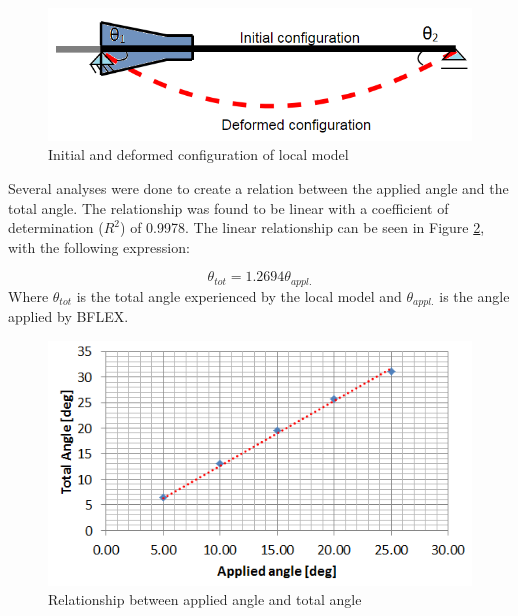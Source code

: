 \begin{figure}[H]
\centering
\includegraphics[scale=0.75]{figures/anglecorr}
\caption[Initial and deformed configuration of local model]{Initial and deformed configuration of local model}
 \label{fig:anglecorr}
\end{figure}

\noindent Several analyses were done to create a relation between the applied angle and the total angle. The relationship was found to be linear with a coefficient of determination ($R^2$) of 0.9978. The linear relationship can be seen in Figure \ref{fig:anglerel}, with the following expression:

\begin{equation}
    \theta_{tot}=1.2694\theta_{appl.}
\end{equation}
Where $\theta_{tot}$ is the total angle experienced by the local model and $\theta_{appl.}$ is the angle applied by BFLEX.
\begin{figure}[H]
\centering
\includegraphics[scale=0.8]{figures/anglerel}
\caption[Relationship between applied angle and total angle]{Relationship between applied angle and total angle}
 \label{fig:anglerel}
\end{figure}

